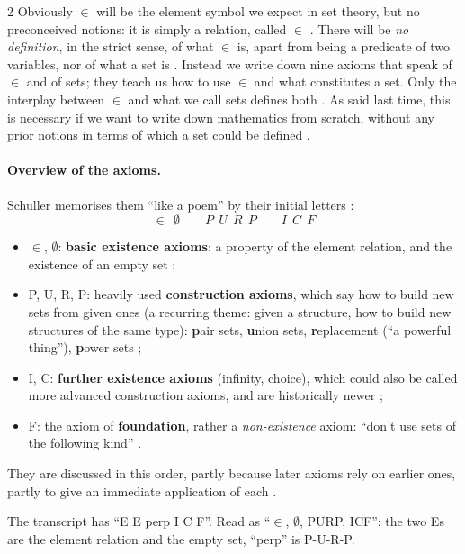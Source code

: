 \begin{paracol}{2}
Obviously $\in$ will be the element symbol we expect in set theory, but no preconceived notions: it is simply a
relation, called $\in$ . There will be \emph{no definition}, in the strict sense, of what $\in$ is,
apart from being a predicate of two variables, nor of what a set is . Instead we write
down nine axioms that speak of $\in$ and of sets; they teach us how to use $\in$ and what constitutes a set. Only
the interplay between $\in$ and what we call sets defines both . As said last time, this
is necessary if we want to write down mathematics from scratch, without any prior notions in terms of which a set
could be defined .

\paragraph{Overview of the axioms.} Schuller memorises them ``like a poem'' by their initial letters
:
\[
  \in\ \ \emptyset\qquad P\ \ U\ \ R\ \ P\qquad I\ \ C\ \ F
\]
\begin{itemize}
  \item $\in$, $\emptyset$: \textbf{basic existence axioms}: a property of the element relation, and the existence of
        an empty set ;
  \item P, U, R, P: heavily used \textbf{construction axioms}, which say how to build new sets from given ones
        (a recurring theme: given a structure, how to build new structures of the same type): \textbf{p}air sets,
        \textbf{u}nion sets, \textbf{r}eplacement (``a powerful thing''), \textbf{p}ower sets ;
  \item I, C: \textbf{further existence axioms} (infinity, choice), which could also be called more advanced
        construction axioms, and are historically newer ;
  \item F: the axiom of \textbf{foundation}, rather a \emph{non-existence} axiom: ``don't use sets of the following
        kind'' .
\end{itemize}
They are discussed in this order, partly because later axioms rely on earlier ones, partly to give an immediate
application of each .
\begin{coursenote}
The transcript has ``E E perp I C F''. Read as ``$\in$, $\emptyset$, PURP, ICF'': the two Es are the element relation
and the empty set, ``perp'' is P-U-R-P.
\end{coursenote}


\end{paracol}
